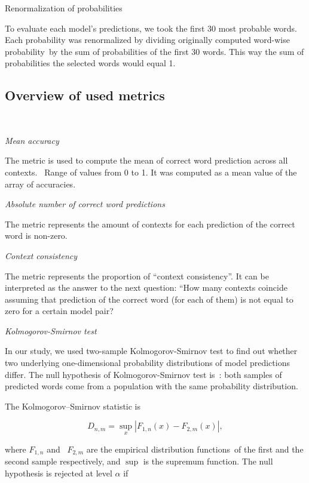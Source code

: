 \documentclass[a4paper]{article}
\newcommand{\head}[1]{\vspace{0.5em}\emph{#1}\vspace{0.25em}}
\begin{document}
Renormalization of probabilities

To evaluate each model’s predictions, we took the first 30 most probable words. Each probability was renormalized by dividing originally computed word-wise probability by the sum of probabilities of the first 30 words. This way the sum of probabilities the selected words would equal 1.

\subsection{Overview of used metrics}

        

\head{Mean accuracy}

The metric is used to compute the mean of correct word prediction across all contexts.  Range of values from 0 to 1. It was computed as a mean value of the array of accuracies.


\head{Absolute number of correct word predictions}

The metric represents the amount of contexts for each prediction of the correct word is non-zero.    


\head{Context consistency}

The metric represents the proportion of “context consistency”. It can be interpreted as the answer to the next question: “How many contexts coincide assuming that prediction of the correct word (for each of them) is not equal to zero for a certain model pair?


\head{Kolmogorov-Smirnov test}

In our study, we used two-sample Kolmogorov-Smirnov test to find out whether two underlying one-dimensional probability distributions of model predictions differ. The null hypothesis of Kolmogorov-Smirnov test is : both samples of predicted words come from a population with the same probability distribution. 

The Kolmogorov–Smirnov statistic is 



\[ {D_{n,m}=\sup _{x}|F_{1,n}(x)-F_{2,m}(x)|,} \]


where \({F_{1,n}}\) and  \({F_{2,m}}\) are the empirical distribution
functions of the first and the second sample respectively, and
\({\sup}\)
is the supremum function. The null hypothesis is rejected at level
\({\alpha }\) if 
\end{document}
